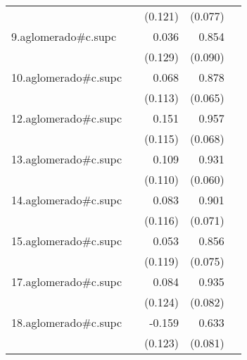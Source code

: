{\begin{longtable}{l*{4}{D{.}{.}{-1}}}
            &                     &     (0.121)         &     (0.077)         &                     \\
\addlinespace
9.aglomerado#c.supc&                     &       0.036         &       0.854\sym{***}&                     \\
            &                     &     (0.129)         &     (0.090)         &                     \\
\addlinespace
10.aglomerado#c.supc&                     &       0.068         &       0.878\sym{***}&                     \\
            &                     &     (0.113)         &     (0.065)         &                     \\
\addlinespace
12.aglomerado#c.supc&                     &       0.151         &       0.957\sym{***}&                     \\
            &                     &     (0.115)         &     (0.068)         &                     \\
\addlinespace
13.aglomerado#c.supc&                     &       0.109         &       0.931\sym{***}&                     \\
            &                     &     (0.110)         &     (0.060)         &                     \\
\addlinespace
14.aglomerado#c.supc&                     &       0.083         &       0.901\sym{***}&                     \\
            &                     &     (0.116)         &     (0.071)         &                     \\
\addlinespace
15.aglomerado#c.supc&                     &       0.053         &       0.856\sym{***}&                     \\
            &                     &     (0.119)         &     (0.075)         &                     \\
\addlinespace
17.aglomerado#c.supc&                     &       0.084         &       0.935\sym{***}&                     \\
            &                     &     (0.124)         &     (0.082)         &                     \\
\addlinespace
18.aglomerado#c.supc&                     &      -0.159         &       0.633\sym{***}&                     \\
            &                     &     (0.123)         &     (0.081)         &                     \\

\end{longtable}}
